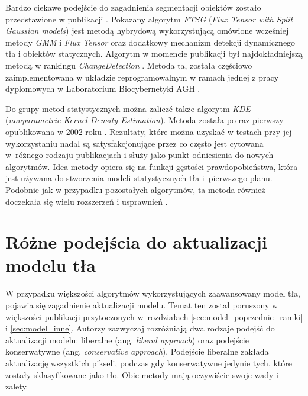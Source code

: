 Bardzo ciekawe podejście do zagadnienia segmentacji obiektów zostało przedstawione w publikacji \cite{wang_14}. 
Pokazany algorytm \textit{FTSG} (\textit{Flux Tensor with Split Gaussian models}) jest metodą hybrydową wykorzystującą omówione wcześniej metody \textit{GMM} i \textit{Flux Tensor} oraz dodatkowy mechanizm detekcji dynamicznego tła i obiektów statycznych. 
Algorytm w momencie publikacji był najdokładniejszą metodą w rankingu \textit{ChangeDetection} \cite{change_detection_web}. 
Metoda ta, została częściowo zaimplementowana w układzie reprogramowalnym w ramach jednej z pracy dyplomowych w Laboratorium Biocybernetyki AGH \cite{janus_15}.

Do grupy metod statystycznych można zaliczć także algorytm \textit{KDE} (\textit{nonparametric Kernel Density Estimation}). 
Metoda została po raz pierwszy opublikowana w 2002 roku \cite{elgammal_02}. 
Rezultaty, które można uzyskać w testach przy jej wykorzystaniu nadal są satysfakcjonujące przez co często jest cytowana w~różnego rodzaju publikacjach i służy jako punkt odniesienia do nowych algorytmów. 
Idea metody opiera się na funkcji gęstości prawdopobieństwa, która jest używana do stworzenia modeli statystycznych tła i~pierwszego planu. 
Podobnie jak w przypadku pozostałych algorytmów, ta metoda również doczekała się wielu rozszerzeń i usprawnień \cite{nonaka_12}.

\section{Różne podejścia do aktualizacji modelu tła}
\label{sec:model_tla_aktualizacja}

W przypadku większości algorytmów wykorzystujących zaawansowany model tła, pojawia się zagadnienie aktualizacji modelu. 
Temat ten został poruszony w większości publikacji przytoczonych w~rozdziałach \ref{sec:model_poprzednie_ramki} i \ref{sec:model_inne}.
Autorzy zazwyczaj rozróżniają dwa rodzaje podejść do aktualizacji modelu: liberalne (ang. \textit{liberal approach}) oraz podejście konserwatywne (ang. \textit{conservative approach}). 
Podejście liberalne zakłada aktualizację wszystkich pikseli, podczas gdy konserwatywne jedynie tych, które zostały sklasyfikowane jako tło. 
Obie metody mają oczywiście swoje wady i zalety.

